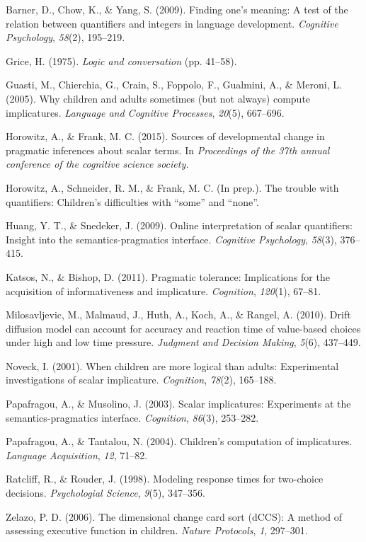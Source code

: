 \documentclass[10pt, letterpaper]{article}
\begin{document}
Barner, D., Chow, K., \& Yang, S. (2009). Finding one's meaning: A test
of the relation between quantifiers and integers in language
development. \emph{Cognitive Psychology}, \emph{58}(2), 195--219.

Grice, H. (1975). \emph{Logic and conversation} (pp. 41--58).

Guasti, M., Chierchia, G., Crain, S., Foppolo, F., Gualmini, A., \&
Meroni, L. (2005). Why children and adults sometimes (but not always)
compute implicatures. \emph{Language and Cognitive Processes},
\emph{20}(5), 667--696.

Horowitz, A., \& Frank, M. C. (2015). Sources of developmental change in
pragmatic inferences about scalar terms. In \emph{Proceedings of the
37th annual conference of the cognitive science society.}

Horowitz, A., Schneider, R. M., \& Frank, M. C. (In prep.). The trouble
with quantifiers: Children's difficulties with ``some'' and ``none''.

Huang, Y. T., \& Snedeker, J. (2009). Online interpretation of scalar
quantifiers: Insight into the semantics-pragmatics interface.
\emph{Cognitive Psychology}, \emph{58}(3), 376--415.

Katsos, N., \& Bishop, D. (2011). Pragmatic tolerance: Implications for
the acquisition of informativeness and implicature. \emph{Cognition},
\emph{120}(1), 67--81.

Milosavljevic, M., Malmaud, J., Huth, A., Koch, A., \& Rangel, A.
(2010). Drift diffusion model can account for accuracy and reaction time
of value-based choices under high and low time pressure. \emph{Judgment
and Decision Making}, \emph{5}(6), 437--449.

Noveck, I. (2001). When children are more logical than adults:
Experimental investigations of scalar implicature. \emph{Cognition},
\emph{78}(2), 165--188.

Papafragou, A., \& Musolino, J. (2003). Scalar implicatures: Experiments
at the semantics-pragmatics interface. \emph{Cognition}, \emph{86}(3),
253--282.

Papafragou, A., \& Tantalou, N. (2004). Children's computation of
implicatures. \emph{Language Acquisition}, \emph{12}, 71--82.

Ratcliff, R., \& Rouder, J. (1998). Modeling response times for
two-choice decisions. \emph{Psychologial Science}, \emph{9}(5),
347--356.

Zelazo, P. D. (2006). The dimensional change card sort (dCCS): A method
of assessing executive function in children. \emph{Nature Protocols},
\emph{1}, 297--301.
\end{document}
